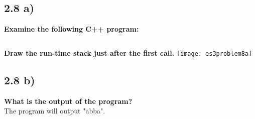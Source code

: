 \documentclass[a4paper,man,natbib]{apa6}
\begin{document}
\subsection{2.8 a)}
\textbf{Examine the following C++ program:}
\inputminted{c++}{./SourceCode/ExampleCPP.cpp}
\textbf{Draw the run-time stack just after the first call.}
\texttt{[image: es3problem8a]} \\
\subsection{2.8 b)}
\textbf{What is the output of the program?} \\
The program will output "abba".

\newpage
\nocite{warford10}

\end{document}

